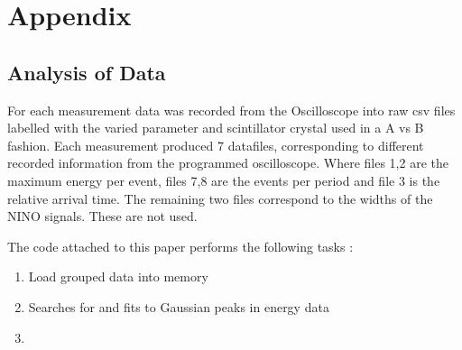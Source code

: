 \section*{Appendix}
\subsection{Analysis of Data}
For each measurement data was recorded from the Oscilloscope into raw csv files labelled with the varied parameter and scintillator crystal used in a A vs B fashion. Each measurement produced 7 datafiles, corresponding to different recorded information from the programmed oscilloscope. Where files 1,2 are the maximum energy per event, files 7,8 are the events per period and file 3 is the relative arrival time. The remaining two files correspond to the widths of the NINO signals. These are not used.

The code attached to this paper performs the following tasks : 

\begin{enumerate}
\item Load grouped data into memory
\item Searches for and fits to Gaussian peaks in energy data
\item 
\end{enumerate}